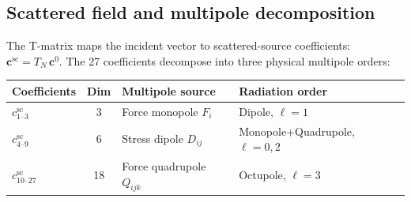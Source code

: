 \documentclass[11pt,a4paper]{article}
\theoremstyle{plain}
\theoremstyle{definition}
\theoremstyle{remark}
\begin{document}
\subsection{Scattered field and multipole decomposition}

The T-matrix maps the incident vector to scattered-source coefficients:
$\bm{c}^{\mathrm{sc}} = T_N\,\bm{c}^0$.  The 27 coefficients
decompose into three physical multipole orders:
\begin{center}
\renewcommand{\arraystretch}{1.3}
\begin{tabular}{lcll}
\toprule
Coefficients & Dim & Multipole source & Radiation order \\
\midrule
$c^{\mathrm{sc}}_{1\text{--}3}$ & 3 & Force monopole $F_i$
  & Dipole, $\ell = 1$ \\
$c^{\mathrm{sc}}_{4\text{--}9}$ & 6 & Stress dipole $D_{ij}$
  & Monopole+Quadrupole, $\ell = 0,2$ \\
$c^{\mathrm{sc}}_{10\text{--}27}$ & 18 & Force quadrupole $Q_{ijk}$
  & Octupole, $\ell = 3$ \\
\bottomrule
\end{tabular}
\end{center}
\end{document}
